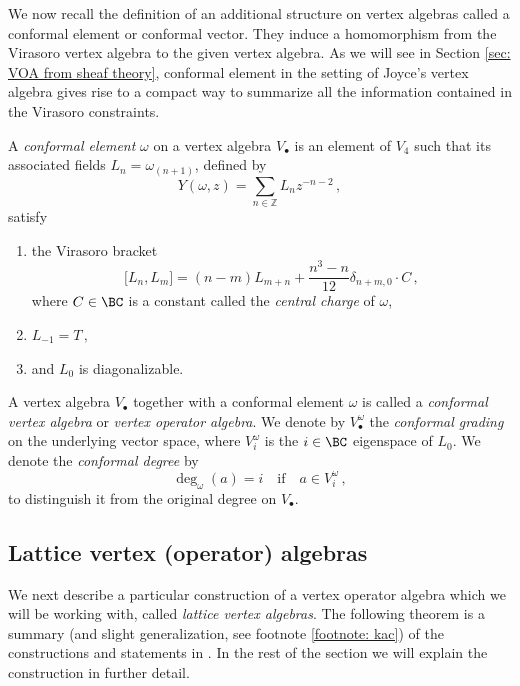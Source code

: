 We now recall the definition of an additional structure on vertex algebras called a conformal element or conformal vector. They induce a homomorphism from the Virasoro vertex algebra to the given vertex algebra. As we will see in Section \ref{sec: VOA from sheaf theory}, conformal element in the setting of Joyce's vertex algebra gives rise to a compact way to summarize all the information contained in the Virasoro constraints.
\begin{definition}
\notready\label{Def: conformal vertex algebra}
 A \textit{conformal element} $\omega$ on a vertex algebra $V_\bullet$ is an element of $V_4$ such that its associated fields $L_n=\omega_{(n+1)}$, defined by
  $$Y(\omega,z) = \sum_{n\in \mathbb{Z}}L_nz^{-n-2}\,,$$
satisfy
 \begin{enumerate}
     \item the Virasoro bracket
     \[\big[L_n,L_m\big] = (n-m)L_{m+n} +\frac{n^3-n}{12}\delta_{n+m,0}\cdot C
     \,,\]
     where $C\in \BC$ is a constant called the \textit{central charge} of $\omega$,
     \item $L_{-1}  = T\,,$
     \item and $L_0$ is diagonalizable.
 \end{enumerate}


A vertex algebra $V_\bullet$ together with a conformal element $\omega$ is called a \textit{conformal vertex algebra} or \textit{vertex operator algebra}. We denote by $V^\omega_{\bullet}$ the \textit{conformal grading} on the underlying vector space, where $V^\omega_i$ is the $i\in \BC$ eigenspace of $L_0$. We denote the \textit{conformal degree} by
$$
\deg_\omega(a) =i\quad \text{if} \quad a\in V^\omega_i\,,
$$
to distinguish it from the original degree on $V_\bullet$.
\end{definition}

\subsection{Lattice vertex (operator) algebras}
We next describe a particular construction of a vertex operator algebra which we will be working with, called \textit{lattice vertex algebras}. The following theorem is a summary (and slight generalization, see footnote \ref{footnote: kac}) of the constructions and statements in \cite[Sections 3.5, 3.6 and 5.5]{Ka98}. In the rest of the section we will explain the construction in further detail.


